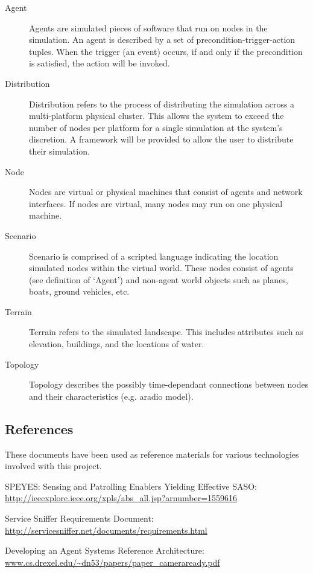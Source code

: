 \documentclass[titlepage]{article}
\begin{document}
\begin{description}
\item[Agent]
	Agents are simulated pieces of software that run on nodes in the simulation. An agent is described by a set of precondition-trigger-action tuples.  When the trigger (an event) occurs, if and only if the precondition is satisfied, the action will be invoked.

\item[Distribution]
	Distribution refers to the process of distributing the simulation across a multi-platform physical cluster.  This allows the system to exceed the number of nodes per platform for a single simulation at the system's discretion.  A framework will be provided to allow the user to distribute their simulation. 	

\item[Node]
	Nodes are virtual or physical machines that consist of agents and network interfaces.  If nodes are virtual, many nodes may run on one physical machine.  

\item[Scenario]
	Scenario is comprised of a scripted language indicating the location simulated nodes within the virtual world. These nodes consist of agents (see definition of `Agent') and non-agent world objects such as planes, boats, ground vehicles, etc. 

\item[Terrain]
	Terrain refers to the simulated landscape.  This includes attributes such as elevation, buildings, and the locations of water. 

\item[Topology]
	Topology describes the possibly time-dependant connections between nodes and their characteristics (e.g. aradio model).
    
\end{description}


\subsection{References%
  \label{references}%
}

These documents have been used as reference materials for various technologies involved with this project.
%
\begin{itemize*}
	\item SPEYES: Sensing and Patrolling Enablers Yielding Effective SASO: \url{http://ieeexplore.ieee.org/xpls/abs_all.jsp?arnumber=1559616}
	\item Service Sniffer Requirements Document: \url{http://servicesniffer.net/documents/requirements.html}
    \item Developing an Agent Systems Reference Architecture: \url{www.cs.drexel.edu/~dn53/papers/paper_cameraready.pdf}
\end{itemize*}
\end{document}
